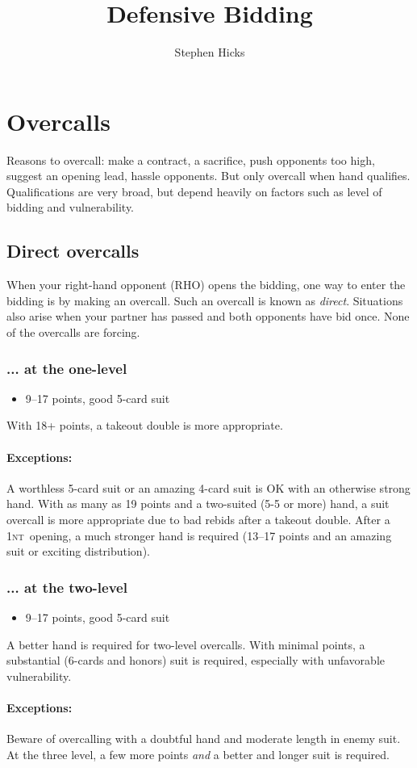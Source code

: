 \documentclass[10pt]{article}
\title{Defensive Bidding}
\author{Stephen Hicks}
\def\NT{\textsc{nt}}
\def\except#1{\paragraph{\exceptparfont\bf Exceptions:}{\exceptfont #1}}
\renewcommand{\bullet}[1]{\begin{itemize}\item#1\end{itemize}\vspace*{-0.5pc}}
\newcommand{\crunch}[1][1]{\vspace*{-#1pc}}
\begin{document}
\maketitle%


\section{Overcalls}
Reasons to overcall: make a contract, a sacrifice, push opponents
too high, suggest an opening lead, hassle opponents.  But only overcall
when hand qualifies.  Qualifications are very broad, but depend heavily
on factors such as level of bidding and vulnerability.

\subsection{Direct overcalls}
When your right-hand opponent (RHO) opens the bidding, one way to enter
the bidding is by making an overcall.  Such an overcall is known as 
\emph{direct}.  Situations also arise when your partner has passed and
both opponents have bid once.  None of the overcalls are forcing.

\subsubsection{... at the one-level}
\bullet{9--17 points, good 5-card suit}
With 18+ points, a takeout double is more appropriate.\crunch
\except{A worthless 5-card suit or an amazing 4-card suit is OK with an 
otherwise strong hand.  With as many as 19 points and a two-suited (5-5 or
more) hand, a suit overcall is more appropriate due to bad rebids after
a takeout double.  After a 1\NT\ opening, a much stronger hand is required
(13--17 points and an amazing suit or exciting distribution).}

\subsubsection{... at the two-level}
\bullet{9--17 points, good 5-card suit}
A better hand is required for two-level overcalls.  With minimal points,
a substantial (6-cards and honors) suit is required, especially with 
unfavorable vulnerability.\crunch
\except{Beware of overcalling with a doubtful hand and moderate length in
enemy suit.  At the three level, a few more points \emph{and} a better and
longer suit is required.}
\end{document}
